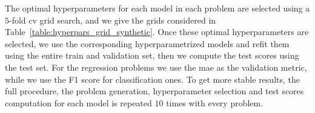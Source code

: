 The optimal hyperparameters for each model in each problem are selected using a $5$-fold \acrshort{cv} grid search, and we give the grids considered in Table~\ref{table:hyperpars_grid_synthetic}.
%
Once these optimal hyperparameters are selected, we use the corresponding hyperparametrized models and refit them using the entire train and validation set, then we compute the test scores using the test set.
%
For the regression problems we use the \acrfull{mae} as the validation metric, while we use the F1 score for classification ones.
%
To get more stable results, the full procedure, the problem generation, hyperparameter selection and test scores computation for each model is repeated $10$ times with every problem.
%

\begin{table}[t!]
    \caption{Hyperparameters, grids used to select them (when appropriate) and hyperparameter selection method for each model in the synthetic problems.
    The parameter $\epsilon$ is only suitable for regression with L1 and L2-SVM.
    }
    \label{table:hyperpars_grid_synthetic}
    \centering
\end{table}

